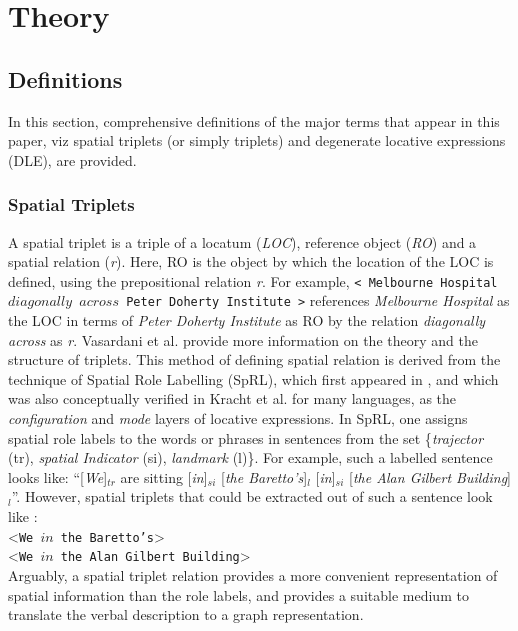 \documentclass[letter]{sig-alternate}
\begin{document}
\section{Theory}
\subsection{Definitions}
In this section, comprehensive definitions of the major terms that appear in this paper, viz spatial triplets (or simply triplets) and degenerate locative expressions (DLE), are provided.
\subsubsection{Spatial Triplets}
A spatial triplet is a triple of a locatum (\textit{LOC}), reference object (\textit{RO}) and a spatial relation (\textit{r}). Here, RO is the object by which the location of the LOC is defined, using the prepositional relation \textit{r}. For example, \texttt{< Melbourne Hospital $diagonally$ $across$ Peter Doherty Institute >} references \textit{Melbourne Hospital} as the LOC in terms of \textit{Peter Doherty Institute} as RO by the relation \textit{diagonally across} as \textit{r}. Vasardani et al. \cite{maria:descriptions} provide more information on the theory and the structure of triplets. This method of defining spatial relation is derived from the technique of Spatial Role Labelling (SpRL), which first appeared in \cite{Kordjamshidi:labelling}, and which was also conceptually verified in Kracht et al. \cite{kracht:semantics} for many languages, as the \textit{configuration} and \textit{mode} layers of locative expressions. In SpRL, one assigns spatial role labels to the words or phrases in sentences from the set \{\textit{trajector} (tr), \textit{spatial Indicator} (si), \textit{landmark} (l)\}. For example, such a labelled sentence looks like:
``[\textit{We}]$_{tr}$ are sitting [\textit{in}]$_{si}$ [\textit{the Baretto's}]$_l$ [\textit{in}]$_{si}$ [\textit{the Alan Gilbert Building}]$_{l}$''. However, spatial triplets that could be extracted out of such a sentence look like : \\<\texttt{We ${in}$ the Baretto's}> \\<\texttt{We ${in}$ the Alan Gilbert Building}>\\
Arguably, a spatial triplet relation provides a more convenient representation of spatial information than the role labels, and provides a suitable medium to translate the verbal description to a graph representation.
\end{document}
